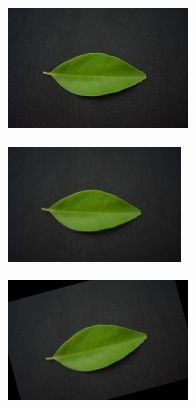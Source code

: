 \documentclass[twocolumn]{article}
\begin{document}
\begin{figure}[H]
    \centering
    \begin{subfigure}[b]{0.30\columnwidth}
        \includegraphics[width=\textwidth]{lemon1}
    \end{subfigure}
    \hfill
    \begin{subfigure}[b]{0.30\columnwidth}
        \includegraphics[width=\textwidth]{lemon2}
    \end{subfigure}
    \hfill
    \begin{subfigure}[b]{0.30\columnwidth}
        \includegraphics[width=\textwidth]{lemon3}
    \end{subfigure}
    \vspace{0.5em}
    

\end{figure}
\end{document}
